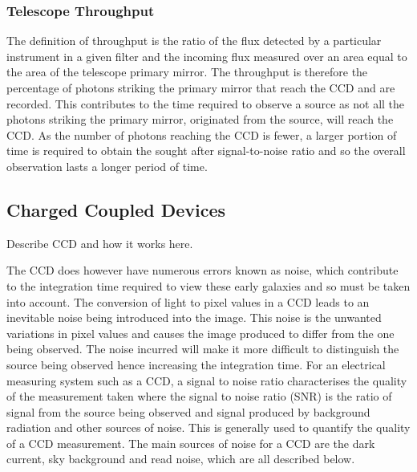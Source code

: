 		\subsubsection{Telescope Throughput} %
		\label{ssub:telescope_throughput}
			The definition of throughput is the ratio of the flux detected by a particular instrument in a given filter and the incoming flux measured over an area equal to the area of the telescope primary mirror\cite{WIRCam_Throughput}. The throughput is therefore the percentage of photons striking the primary mirror that reach the CCD and are recorded. This contributes to the time required to observe a source as not all the photons striking the primary mirror, originated from the source, will reach the CCD. As the number of photons reaching the CCD is fewer, a larger portion of time is required to obtain the sought after signal-to-noise ratio and so the overall observation lasts a longer period of time.

	\subsection{Charged Coupled Devices} %
	\label{sub:charged_coupled_devices}
		Describe CCD and how it works here.

		The CCD does however have numerous errors known as noise, which contribute to the integration time required to view these early galaxies and so must be taken into account. The conversion of light to pixel values in a CCD leads to an inevitable noise being introduced into the image. This noise is the unwanted variations in pixel values and causes the image produced to differ from the one being observed. The noise incurred will make it more difficult to distinguish the source being observed hence increasing the integration time. For an electrical measuring system such as a CCD, a signal to noise ratio characterises the quality of the measurement taken where the signal to noise ratio (SNR) is the ratio of signal from the source being observed and signal produced by background radiation and other sources of noise. This is generally used to quantify the quality of a CCD measurement. The main sources of noise for a CCD are the dark current, sky background and read noise, which are all described below.

